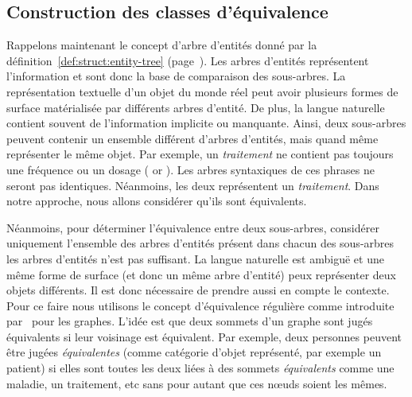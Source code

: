 \subsection{Construction des classes d'équivalence}
Rappelons maintenant le concept d'arbre d'entités donné par la définition~\ref{def:struct:entity-tree} (page~\pageref{def:struct:entity-tree}).
Les arbres d'entités représentent l'information et sont donc la base de comparaison des sous-arbres.
La représentation textuelle d'un objet du monde réel peut avoir plusieurs formes de surface matérialisée par différents arbres d'entité.
De plus, la langue naturelle contient souvent de l'information implicite ou manquante.
Ainsi, deux sous-arbres peuvent contenir un ensemble différent d'arbres d'entités, mais quand même représenter le même objet.
Par exemple, un \emph{traitement} ne contient pas toujours une fréquence ou un dosage ( or ).
Les arbres syntaxiques de ces phrases ne seront pas identiques.
Néanmoins, les deux représentent un \emph{traitement}.
Dans notre approche, nous allons considérer qu'ils sont équivalents.

Néanmoins, pour déterminer l'équivalence entre deux sous-arbres, considérer uniquement l'ensemble des arbres d'entités présent dans chacun des sous-arbres les arbres d'entités n'est pas suffisant.
La langue naturelle est ambiguë et une même forme de surface (et donc un même arbre d'entité) peux représenter deux objets différents.
Il est donc nécessaire de prendre aussi en compte le contexte.
Pour ce faire nous utilisons le concept d'équivalence régulière comme introduite par~\cite{whiteGraphSemigroupHomomorphisms1983} pour les graphes.
L'idée est que deux sommets d'un graphe sont jugés équivalents si leur voisinage est équivalent.
Par exemple, deux personnes peuvent être jugées \emph{équivalentes} (comme catégorie d'objet représenté, par exemple un patient) si elles sont toutes les deux liées à des sommets \emph{équivalents} comme une maladie, un traitement, etc sans pour autant que ces nœuds soient les mêmes.

